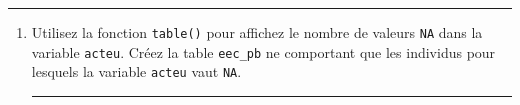 \documentclass[12pt,twosided, notitlepage]{book}
\newenvironment{Shaded}{}{}
\newcommand{\KeywordTok}[1]{\textcolor[rgb]{0.00,0.00,1.00}{{#1}}}
\newcommand{\DataTypeTok}[1]{{#1}}
\newcommand{\StringTok}[1]{\textcolor[rgb]{0.00,0.50,0.50}{{#1}}}
\newcommand{\CommentTok}[1]{\textcolor[rgb]{0.00,0.50,0.00}{{#1}}}
\newcommand{\NormalTok}[1]{{#1}}
\newif \ifsol
\renewenvironment{Shaded}{\begin{snugshade}}{\end{snugshade}}
\begin{document}
\begin{enumerate}
  \begin{center}\rule{0.5\linewidth}{\linethickness}\end{center}

  \begin{enumerate}
  \def\labelenumii{\roman{enumii}.}
  \item
    Utilisez la fonction \texttt{table()} pour
    affichez le nombre de valeurs \texttt{NA} dans la variable
    \texttt{acteu}. Créez la table \texttt{eec\_pb} ne comportant que
    les individus pour lesquels la variable \texttt{acteu} vaut
    \texttt{NA}.

    \ifsol  \textbf{Indication} Pour créer la table \texttt{eec\_pb},
    pensez à utiliser la fonction \texttt{is.na()}.\fi 

    \ifsol 

    \begin{center} \rule{0.5\linewidth}{\linethickness}\end{center}

\begin{Shaded}
\end{Shaded}
\end{enumerate}
\end{enumerate}
\end{document}
